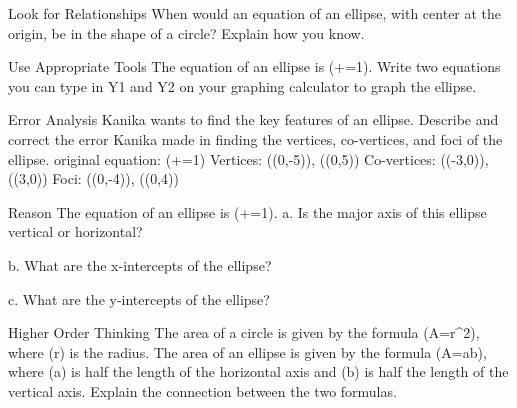 \documentclass{article}
\newenvironment{practice}[2]{}{}        %
\newcommand{\answer}[1]{}               %
\newcommand{\te}[1]{}                   %
\begin{document}
\begin{practice}{9}{2}
Look for Relationships When would an equation of an ellipse, with center at the origin, be in the shape of a circle? Explain how you know.
\answer{When the values of (a) and (b) are equal, the vertices and co-vertices are the same distance from the center of the ellipse, which forms a circle.}
\end{practice}
\begin{practice}{10}{3}
Use Appropriate Tools The equation of an ellipse is (+=1). Write two equations you can type in Y1 and Y2 on your graphing calculator to graph the ellipse.
\answer{(Y_1=\frac{\sqrt{36-x^2}}{3}), (Y_2=-\frac{\sqrt{36-x^2}}{3})}
\end{practice}
\begin{practice}{11}{2}
Error Analysis Kanika wants to find the key features of an ellipse. Describe and correct the error Kanika made in finding the vertices, co-vertices, and foci of the ellipse.
original equation: (+=1)
Vertices: ((0,-5)), ((0,5))
Co-vertices: ((-3,0)), ((3,0))
Foci: ((0,-4)), ((0,4))
\te{The student work is marked with a red X.}
\answer{Kendall incorrectly thought the ellipse was centered at the origin. The vertices are located at ((4,1)) and ((4,11)). The co-vertices are located at ((7,6)) and ((1,6)). The foci are located at ((4,2)) and ((4,10)).}
\te{Printed key names Kendall; the problem names Kanika.}
\end{practice}
\begin{practice}{12}{2}
Reason The equation of an ellipse is (+=1).
a. Is the major axis of this ellipse vertical or horizontal?
\answer{vertical}
b. What are the x-intercepts of the ellipse?
\answer{((-5,0)), ((5,0))}
c. What are the y-intercepts of the ellipse?
\answer{((0,-7)), ((0,7))}
\end{practice}
\begin{practice}{13}{3}
Higher Order Thinking The area of a circle is given by the formula (A=\pi r^2), where (r) is the radius. The area of an ellipse is given by the formula (A=\pi ab), where (a) is half the length of the horizontal axis and (b) is half the length of the vertical axis. Explain the connection between the two formulas.
\answer{When (c) is close to 0, (a) and (b) are close to the same. This means the area of the ellipse can be written as (A=\pi(a)(a)), or (A=\pi a^2). This formula is the same as the area of a circle with radius (a).}
\te{The printed explanation uses equality for values described as close; exact equality requires (c=0).}
\end{practice}
\end{document}
